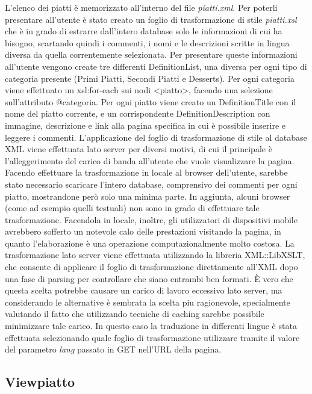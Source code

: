 \documentclass[10pt,a4paper,onecolumn]{article}
\begin{document}
L’elenco dei piatti è memorizzato all’interno del file \textit{piatti.xml}. Per poterli presentare all’utente è stato creato un foglio di trasformazione di stile \textit{piatti.xsl} che è in grado di estrarre dall’intero database solo le informazioni di cui ha bisogno, scartando quindi i commenti, i nomi e le descrizioni scritte in lingua diversa da quella correntemente selezionata.
Per presentare queste informazioni all’utente vengono create tre differenti DefinitionList, una diversa per ogni tipo di categoria presente (Primi Piatti, Secondi Piatti e Desserts).
Per ogni categoria viene effettuato un xsl:for-each sui nodi <piatto>, facendo una selezione sull’attributo @categoria. Per ogni piatto viene creato un DefinitionTitle con il nome del piatto corrente, e un corrispondente DefinitionDescription con immagine, descrizione e link alla pagina specifica in cui è possibile inserire e leggere i commenti.
L’applicazione del foglio di trasformazione di stile al database XML viene effettuata lato server per diversi motivi, di cui il principale è l'alleggerimento del carico di banda all’utente che vuole visualizzare la pagina. Facendo effettuare la trasformazione in locale al browser dell’utente, sarebbe stato necessario scaricare l’intero database, comprensivo dei commenti per ogni piatto, mostrandone però solo una minima parte. In aggiunta, alcuni browser (come ad esempio quelli testuali) non sono in grado di effettuare tale trasformazione. Facendola in locale, inoltre, gli utilizzatori di dispositivi mobile avrebbero sofferto un notevole calo delle prestazioni visitando la pagina, in quanto l’elaborazione è una operazione computazionalmente molto costosa.
La trasformazione lato server viene effettuata utilizzando la libreria XML::LibXSLT, che consente di applicare il foglio di trasformazione direttamente all’XML dopo una fase di parsing per controllare che siano entrambi ben formati.
\`E vero che questa scelta potrebbe causare un carico di lavoro eccessivo lato server, ma considerando le alternative è sembrata la scelta piu ragionevole, specialmente valutando il fatto che utilizzando tecniche di caching sarebbe possibile minimizzare tale carico.
In questo caso la traduzione in differenti lingue è stata effettuata selezionando quale foglio di trasformazione utilizzare tramite il valore del parametro \textit{lang} passato in GET nell’URL della pagina.

\subsection{Viewpiatto}
\end{document}
